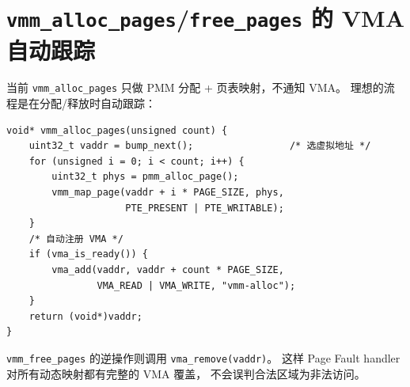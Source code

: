 \section{\texttt{vmm\_alloc\_pages}/\texttt{free\_pages} 的 VMA 自动跟踪}

当前 \texttt{vmm\_alloc\_pages} 只做 PMM 分配 + 页表映射，不通知 VMA。
理想的流程是在分配/释放时自动跟踪：

\begin{lstlisting}[style=cstyle]
void* vmm_alloc_pages(unsigned count) {
    uint32_t vaddr = bump_next();                 /* 选虚拟地址 */
    for (unsigned i = 0; i < count; i++) {
        uint32_t phys = pmm_alloc_page();
        vmm_map_page(vaddr + i * PAGE_SIZE, phys,
                     PTE_PRESENT | PTE_WRITABLE);
    }
    /* 自动注册 VMA */
    if (vma_is_ready()) {
        vma_add(vaddr, vaddr + count * PAGE_SIZE,
                VMA_READ | VMA_WRITE, "vmm-alloc");
    }
    return (void*)vaddr;
}
\end{lstlisting}

\texttt{vmm\_free\_pages} 的逆操作则调用 \texttt{vma\_remove(vaddr)}。
这样 Page Fault handler 对所有动态映射都有完整的 VMA 覆盖，
不会误判合法区域为非法访问。


